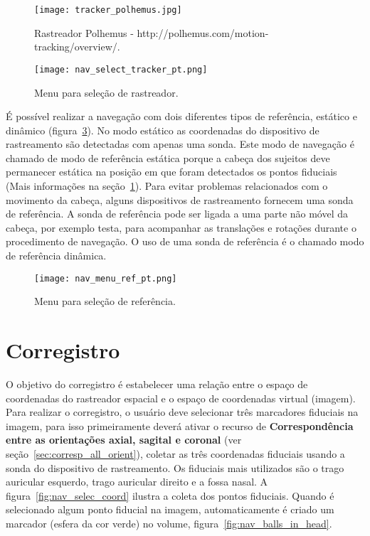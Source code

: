 \begin{figure}[!htb]
\centering
\texttt{[image: tracker\_polhemus.jpg]}
\caption{Rastreador Polhemus - http://polhemus.com/motion-tracking/overview/.}
\label{fig:tracker_polhemus}
\end{figure}

\begin{figure}[!htb]
\centering
\texttt{[image: nav\_select\_tracker\_pt.png]}
\caption{Menu para seleção de rastreador.}
\label{fig:nav_select_tracker}
\end{figure}

É possível realizar a navegação com dois diferentes tipos de referência, estático e dinâmico (figura~\ref{fig:nav_menu_ref}). No modo estático as coordenadas do dispositivo de rastreamento são detectadas com apenas uma sonda. Este modo de navegação é chamado de modo de referência estática porque a cabeça dos sujeitos deve permanecer estática na posição em que foram detectados os pontos fiduciais (Mais informações na seção~\ref{sec:corregistro}).
Para evitar problemas relacionados com o movimento da cabeça, alguns dispositivos de rastreamento fornecem uma sonda de referência. A sonda de referência pode ser ligada a uma parte não móvel da cabeça, por exemplo testa, para acompanhar as translações e rotações durante o procedimento de navegação. O uso de uma sonda de referência é o chamado modo de referência dinâmica.

\begin{figure}[!htb]
\centering
\texttt{[image: nav\_menu\_ref\_pt.png]}
\caption{Menu para seleção de referência.}
\label{fig:nav_menu_ref}
\end{figure}

\section{Corregistro}
\label{sec:corregistro}

O objetivo do corregistro é estabelecer uma relação entre o espaço de coordenadas do rastreador espacial e o espaço de coordenadas virtual (imagem). Para realizar o corregistro, o usuário deve selecionar três marcadores fiduciais na imagem, para isso primeiramente deverá ativar o recurso de \textbf{Correspondência entre as orientações axial, sagital e coronal} (ver seção~\ref{sec:corresp_all_orient}), coletar as três coordenadas fiduciais usando a sonda do dispositivo de rastreamento. Os fiduciais mais utilizados são o trago auricular esquerdo, trago auricular direito e a fossa nasal. A figura~\ref{fig:nav_selec_coord} ilustra a coleta dos pontos fiduciais. Quando é selecionado algum ponto fiducial na imagem, automaticamente é criado um marcador (esfera da cor verde) no volume, figura~\ref{fig:nav_balls_in_head}.

